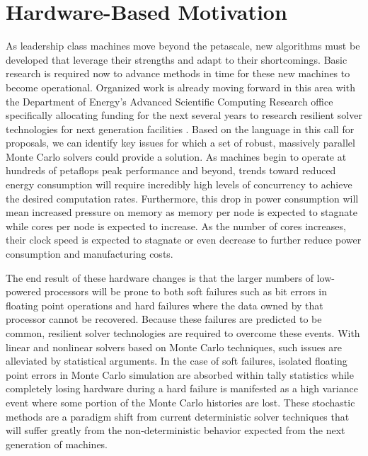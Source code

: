 \section{Hardware-Based Motivation}
\label{sec:hardware_motivation}
As leadership class machines move beyond the petascale, new algorithms
must be developed that leverage their strengths and adapt to their
shortcomings. Basic research is required now to advance methods in
time for these new machines to become operational. Organized work is
already moving forward in this area with the Department of Energy's
Advanced Scientific Computing Research office specifically allocating
funding for the next several years to research resilient solver
technologies for next generation facilities
\cite{u.s._department_of_energy_resilient_2012}. Based on the language
in this call for proposals, we can identify key issues for which a set
of robust, massively parallel Monte Carlo solvers could provide a
solution. As machines begin to operate at hundreds of petaflops peak
performance and beyond, trends toward reduced energy consumption will
require incredibly high levels of concurrency to achieve the desired
computation rates. Furthermore, this drop in power consumption will
mean increased pressure on memory as memory per node is expected to
stagnate while cores per node is expected to increase. As the number
of cores increases, their clock speed is expected to stagnate or even
decrease to further reduce power consumption and manufacturing costs.

The end result of these hardware changes is that the larger numbers of
low-powered processors will be prone to both soft failures such as bit
errors in floating point operations and hard failures where the data
owned by that processor cannot be recovered. Because these failures
are predicted to be common, resilient solver technologies are required
to overcome these events. With linear and nonlinear solvers based on
Monte Carlo techniques, such issues are alleviated by statistical
arguments. In the case of soft failures, isolated floating point
errors in Monte Carlo simulation are absorbed within tally statistics
while completely losing hardware during a hard failure is manifested
as a high variance event where some portion of the Monte Carlo
histories are lost. These stochastic methods are a paradigm shift from
current deterministic solver techniques that will suffer greatly from
the non-deterministic behavior expected from the next generation of
machines.

